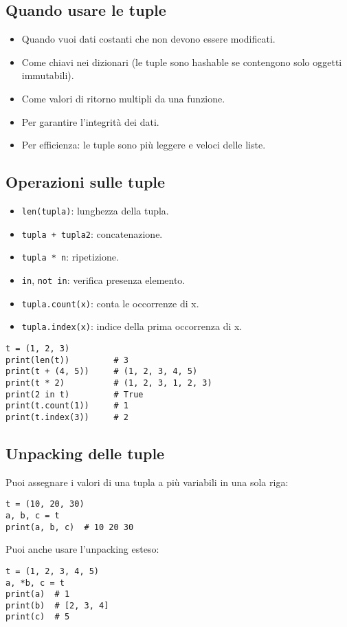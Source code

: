 \documentclass[a4paper,12pt]{article}
\begin{document}
\subsection*{Quando usare le tuple}
\begin{itemize}
    \item Quando vuoi dati costanti che non devono essere modificati.
    \item Come chiavi nei dizionari (le tuple sono hashable se contengono solo oggetti immutabili).
    \item Come valori di ritorno multipli da una funzione.
    \item Per garantire l'integrità dei dati.
    \item Per efficienza: le tuple sono più leggere e veloci delle liste.
\end{itemize}

\subsection*{Operazioni sulle tuple}
\begin{itemize}
    \item \texttt{len(tupla)}: lunghezza della tupla.
    \item \texttt{tupla + tupla2}: concatenazione.
    \item \texttt{tupla * n}: ripetizione.
    \item \texttt{in}, \texttt{not in}: verifica presenza elemento.
    \item \texttt{tupla.count(x)}: conta le occorrenze di x.
    \item \texttt{tupla.index(x)}: indice della prima occorrenza di x.
\end{itemize}
\begin{lstlisting}
t = (1, 2, 3)
print(len(t))         # 3
print(t + (4, 5))     # (1, 2, 3, 4, 5)
print(t * 2)          # (1, 2, 3, 1, 2, 3)
print(2 in t)         # True
print(t.count(1))     # 1
print(t.index(3))     # 2
\end{lstlisting}

\subsection*{Unpacking delle tuple}
Puoi assegnare i valori di una tupla a più variabili in una sola riga:
\begin{lstlisting}
t = (10, 20, 30)
a, b, c = t
print(a, b, c)  # 10 20 30
\end{lstlisting}
Puoi anche usare l'unpacking esteso:
\begin{lstlisting}
t = (1, 2, 3, 4, 5)
a, *b, c = t
print(a)  # 1
print(b)  # [2, 3, 4]
print(c)  # 5
\end{lstlisting}
\end{document}
